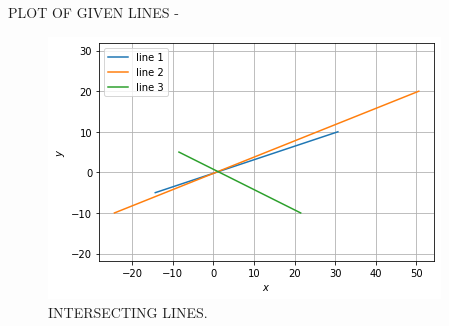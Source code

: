 \documentclass[journal,12pt,twocolumn]{IEEEtran}
\begin{document}
PLOT OF GIVEN LINES -
\begin{figure}[ht!]
    \centering
    \includegraphics[width=\columnwidth]{FIG-4.png}
    \caption{INTERSECTING LINES.}
    \label{fig:INTERSECTING LINES.}
\end{figure} 
\end{document}
